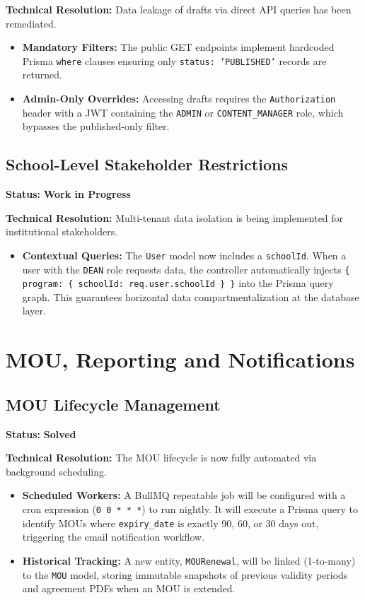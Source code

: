 \documentclass[12pt, a4paper]{article}
\begin{document}
\textbf{Technical Resolution:}
Data leakage of drafts via direct API queries has been remediated.
\begin{itemize}
    \item \textbf{Mandatory Filters:} The public GET endpoints implement hardcoded Prisma \texttt{where} clauses ensuring only \texttt{status: 'PUBLISHED'} records are returned.
    \item \textbf{Admin-Only Overrides:} Accessing drafts requires the \texttt{Authorization} header with a JWT containing the \texttt{ADMIN} or \texttt{CONTENT\_MANAGER} role, which bypasses the published-only filter.
\end{itemize}

\subsection{School-Level Stakeholder Restrictions}
\textbf{Status:} \textcolor{wip}{\textbf{Work in Progress}}

\textbf{Technical Resolution:}
Multi-tenant data isolation is being implemented for institutional stakeholders.
\begin{itemize}
    \item \textbf{Contextual Queries:} The \texttt{User} model now includes a \texttt{schoolId}. When a user with the \texttt{DEAN} role requests data, the controller automatically injects \texttt{\{ program: \{ schoolId: req.user.schoolId \} \}} into the Prisma query graph. This guarantees horizontal data compartmentalization at the database layer.
\end{itemize}

\section{MOU, Reporting and Notifications}

\subsection{MOU Lifecycle Management}
\textbf{Status:} \textcolor{solved}{\textbf{Solved}}

\textbf{Technical Resolution:}
The MOU lifecycle is now fully automated via background scheduling.
\begin{itemize}
    \item \textbf{Scheduled Workers:} A BullMQ repeatable job will be configured with a cron expression (\texttt{0 0 * * *}) to run nightly. It will execute a Prisma query to identify MOUs where \texttt{expiry\_date} is exactly 90, 60, or 30 days out, triggering the email notification workflow.
    \item \textbf{Historical Tracking:} A new entity, \texttt{MOURenewal}, will be linked (1-to-many) to the \texttt{MOU} model, storing immutable snapshots of previous validity periods and agreement PDFs when an MOU is extended.
\end{itemize}
\end{document}
